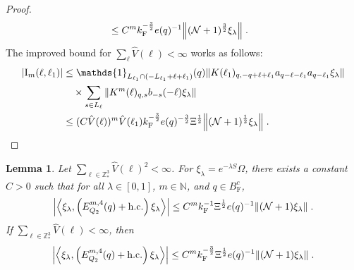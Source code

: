 \documentclass[12pt,a4paper]{article}
\numberwithin{equation}{section}
\newcommand{\NNN}{\mathbb{N}}
\newcommand{\1}{\mathbb{I}}
\newcommand{\F}{\mathrm{F}}
\newcommand{\I}{\mathrm{I}}
\newcommand{\Z}{\mathbb{Z}}
\newcommand{\NN}{\mathcal{N}}
\newcommand{\half}{\frac{1}{2}}
\newcommand{\eva}[1]{\left\langle #1 \right\rangle}
\theoremstyle{plain}
\newtheorem{lemma}[theorem]{Lemma}
\theoremstyle{definition}
\theoremstyle{remark}
\theoremstyle{plain}
\theoremstyle{definition}
\theoremstyle{remark}
\begin{document}
\begin{proof}
\begin{align}
	&\leq C^m k_{\F}^{-\frac 32} e(q)^{-1}
		\norm{(\NN+1)^{\frac 32} \xi_\lambda} \;. \label{eq:estEQ2153_Coulomb}
\end{align}
The improved bound for $ \sum_\ell \hat{V}(\ell) < \infty $ works as follows:
\begin{align}
	|\I_m(\ell, \ell_1)|
	&\leq \mathds{1}_{L_{\ell_1} \cap (-L_{\ell_1} + \ell + \ell_1)}(q) \norm{K(\ell_1)_{q,-q+\ell+\ell_1} a_{q-\ell-\ell_1} a_{q-\ell_1} \xi_\lambda}  \label{eq:estEQ2153} \\
	& \quad \times
		\sum_{ s \in L_{\ell}}
		\norm{ K^m(\ell)_{q,s} b_{-s}(-\ell) \xi_\lambda }\nonumber\\
	&\leq (C \hat{V}(\ell))^m
		\hat{V}(\ell_1)
		k_{\F}^{-\frac 32} e(q)^{-\frac 32} \Xi^\half
		\norm{(\NN+1)^\half\xi_\lambda} \;. \qedhere \nonumber
\end{align}
\end{proof}


\begin{lemma} \label{lem:EQ217}
Let $ \sum_{\ell \in \Z^3_*} \hat{V}(\ell)^2 < \infty $. For $\xi_\lambda = e^{-\lambda S} \Omega$, there exists a constant $ C > 0 $ such that for all $ \lambda \in [0,1] $, $ m \in \NNN $, and $ q \in B_{\F}^c $,
\begin{align}
	\abs{\eva{\xi_\lambda,\left(E^{m,4}_{Q_2}(q) + \mathrm{h.c.}\right) \xi_\lambda }}
	\leq C^m k_{\F}^{-1} \Xi^{\half}  e(q)^{-1} 
		\norm{(\NN+1) \xi_\lambda } \;. \label{eq:estEQ217_Coulomb}
\end{align}
If $ \sum_{\ell \in \Z^3_*} \hat{V}(\ell) < \infty $, then
\begin{align}
	\abs{\eva{\xi_\lambda,\left(E^{m,4}_{Q_2}(q) + \mathrm{h.c.}\right) \xi_\lambda }}
	\leq C^m k_{\F}^{-\frac 32} \Xi^{\half}  e(q)^{-1} 
		\norm{(\NN+1) \xi_\lambda } \;. \label{eq:estEQ217}
\end{align}
\end{lemma}
\end{document}
